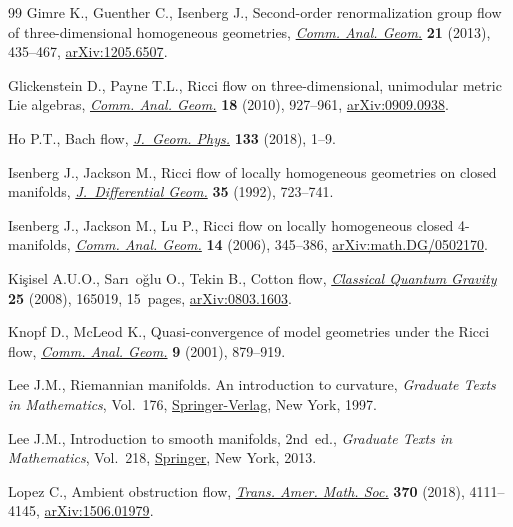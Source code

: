 \documentclass[10pt,a4paper]{amsart}
\numberwithin{equation}{section}
\begin{document}
\begin{thebibliography}{99}
Gimre K., Guenther C., Isenberg J., Second-order renormalization group flow of
 three-dimensional homogeneous geometries, \href{https://doi.org/10.4310/CAG.2013.v21.n2.a7}{\textit{Comm. Anal. Geom.}} \textbf{21} (2013), 435--467, \href{https://arxiv.org/abs/1205.6507}{arXiv:1205.6507}.

Glickenstein D., Payne T.L., Ricci flow on three-dimensional, unimodular metric
 {L}ie algebras, \href{https://doi.org/10.4310/CAG.2010.v18.n5.a3}{\textit{Comm. Anal. Geom.}} \textbf{18} (2010), 927--961, \href{https://arxiv.org/abs/0909.0938}{arXiv:0909.0938}.

Ho P.T., Bach flow, \href{https://doi.org/10.1016/j.geomphys.2018.07.008}{\textit{J.~Geom. Phys.}} \textbf{133} (2018), 1--9.

Isenberg J., Jackson M., Ricci flow of locally homogeneous geometries on closed
 manifolds, \href{https://doi.org/10.4310/jdg/1214448265}{\textit{J.~Differential Geom.}} \textbf{35} (1992), 723--741.

Isenberg J., Jackson M., Lu P., Ricci flow on locally homogeneous closed
 4-manifolds, \href{https://dx.doi.org/10.4310/CAG.2006.v14.n2.a5}{\textit{Comm. Anal. Geom.}} \textbf{14} (2006), 345--386, \href{https://arxiv.org/abs/math.DG/0502170}{arXiv:math.DG/0502170}.

Ki\c{s}isel A.U.O., Sar\i~o\u{g}lu O., Tekin B., Cotton flow, \href{https://doi.org/10.1088/0264-9381/25/16/165019}{\textit{Classical
 Quantum Gravity}} \textbf{25} (2008), 165019, 15~pages, \href{https://arxiv.org/abs/0803.1603}{arXiv:0803.1603}.

Knopf D., McLeod K., Quasi-convergence of model geometries under the {R}icci
 flow, \href{https://doi.org/10.4310/CAG.2001.v9.n4.a7}{\textit{Comm. Anal. Geom.}} \textbf{9} (2001), 879--919.

Lee J.M., Riemannian manifolds. An introduction to curvature, \textit{Graduate
 Texts in Mathematics}, Vol.~176, \href{https://doi.org/10.1007/b98852}{Springer-Verlag}, New York, 1997.

Lee J.M., Introduction to smooth manifolds, 2nd~ed., \textit{Graduate Texts in
 Mathematics}, Vol.~218, \href{https://doi.org/10.1007/978-1-4419-9982-5}{Springer}, New York, 2013.

Lopez C., Ambient obstruction flow, \href{https://doi.org/10.1090/tran/7106}{\textit{Trans. Amer. Math. Soc.}} \textbf{370} (2018), 4111--4145, \href{https://arxiv.org/abs/1506.01979}{arXiv:1506.01979}.


\end{thebibliography}
\end{document}
